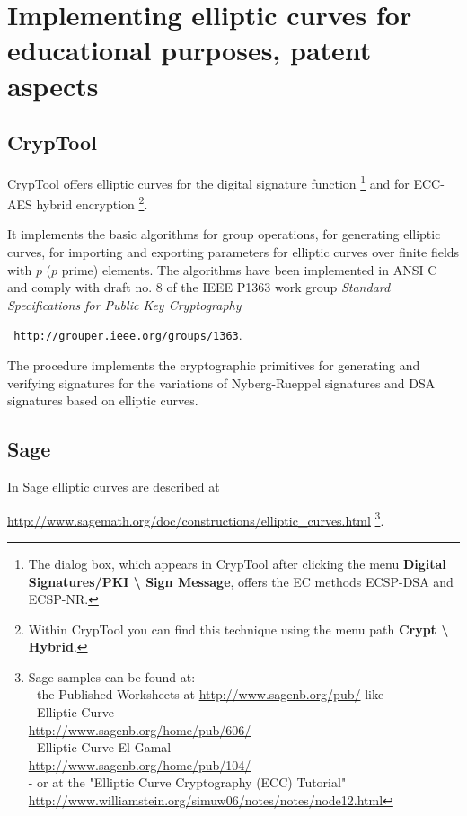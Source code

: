 \section{Implementing elliptic curves for educational purposes, patent aspects}


\subsection{CrypTool}

CrypTool offers elliptic curves for the digital signature function%
\footnote{%
The dialog box, which appears in CrypTool after clicking the menu
{\bf Digital Signatures/PKI \textbackslash{} Sign Message},
offers the EC methods ECSP-DSA and ECSP-NR.
} and for ECC-AES hybrid encryption%
\footnote{%
Within CrypTool you can find this technique using the menu
path {\bf Crypt \textbackslash{} Hybrid}.
}.

It implements the basic algorithms for group operations, for generating elliptic
curves, for importing and exporting parameters for elliptic curves over finite
fields with $p$ ($p$ prime) elements. The algorithms have been implemented in
ANSI C and comply with draft no. 8 of the IEEE P1363 work group {\em Standard
Specifications for Public Key Cryptography}

{\href{http://grouper.ieee.org/groups/1363}{\tt
http://grouper.ieee.org/groups/1363}}.

The procedure implements the cryptographic primitives for generating and
verifying signatures for the variations of Nyberg-Rueppel signatures and
 DSA signatures based on elliptic curves.


\subsection{Sage}
\label{ec:Sage_Massierer}

In Sage elliptic curves are described at

\url{http://www.sagemath.org/doc/constructions/elliptic_curves.html}%
\footnote{%
Sage samples can be found at:\\
- the Published Worksheets at \url{http://www.sagenb.org/pub/} like\\
- Elliptic Curve\\
  \url{http://www.sagenb.org/home/pub/606/} \\
- Elliptic Curve El Gamal\\
  \url{http://www.sagenb.org/home/pub/104/} \\
- or at the "Elliptic Curve Cryptography (ECC) Tutorial"\\
  \url{http://www.williamstein.org/simuw06/notes/notes/node12.html}
}.


